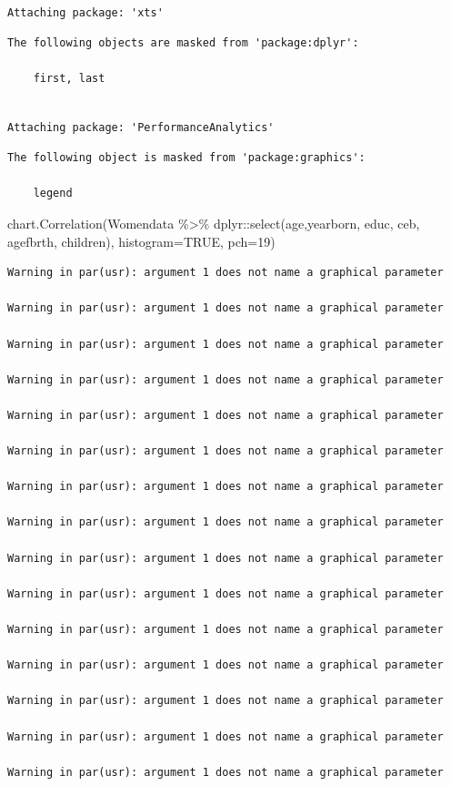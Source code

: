 \documentclass[
  letterpaper,
  DIV=11,
  numbers=noendperiod]{scrartcl}
\newenvironment{Shaded}{\begin{snugshade}}{\end{snugshade}}
\newcommand{\AttributeTok}[1]{\textcolor[rgb]{0.40,0.45,0.13}{#1}}
\newcommand{\ConstantTok}[1]{\textcolor[rgb]{0.56,0.35,0.01}{#1}}
\newcommand{\DecValTok}[1]{\textcolor[rgb]{0.68,0.00,0.00}{#1}}
\newcommand{\FunctionTok}[1]{\textcolor[rgb]{0.28,0.35,0.67}{#1}}
\newcommand{\NormalTok}[1]{\textcolor[rgb]{0.00,0.23,0.31}{#1}}
\newcommand{\SpecialCharTok}[1]{\textcolor[rgb]{0.37,0.37,0.37}{#1}}
\begin{document}
\begin{verbatim}

Attaching package: 'xts'
\end{verbatim}

\begin{verbatim}
The following objects are masked from 'package:dplyr':

    first, last
\end{verbatim}

\begin{verbatim}

Attaching package: 'PerformanceAnalytics'
\end{verbatim}

\begin{verbatim}
The following object is masked from 'package:graphics':

    legend
\end{verbatim}

\begin{Shaded}
\begin{Highlighting}[]
\FunctionTok{chart.Correlation}\NormalTok{(Womendata }\SpecialCharTok{\%\textgreater{}\%} 
\NormalTok{              dplyr}\SpecialCharTok{::}\FunctionTok{select}\NormalTok{(age,yearborn, educ, ceb, agefbrth, children), }\AttributeTok{histogram=}\ConstantTok{TRUE}\NormalTok{, }\AttributeTok{pch=}\DecValTok{19}\NormalTok{)}
\end{Highlighting}
\end{Shaded}

\begin{verbatim}
Warning in par(usr): argument 1 does not name a graphical parameter

Warning in par(usr): argument 1 does not name a graphical parameter

Warning in par(usr): argument 1 does not name a graphical parameter

Warning in par(usr): argument 1 does not name a graphical parameter

Warning in par(usr): argument 1 does not name a graphical parameter

Warning in par(usr): argument 1 does not name a graphical parameter

Warning in par(usr): argument 1 does not name a graphical parameter

Warning in par(usr): argument 1 does not name a graphical parameter

Warning in par(usr): argument 1 does not name a graphical parameter

Warning in par(usr): argument 1 does not name a graphical parameter

Warning in par(usr): argument 1 does not name a graphical parameter

Warning in par(usr): argument 1 does not name a graphical parameter

Warning in par(usr): argument 1 does not name a graphical parameter

Warning in par(usr): argument 1 does not name a graphical parameter

Warning in par(usr): argument 1 does not name a graphical parameter
\end{verbatim}
\end{document}
